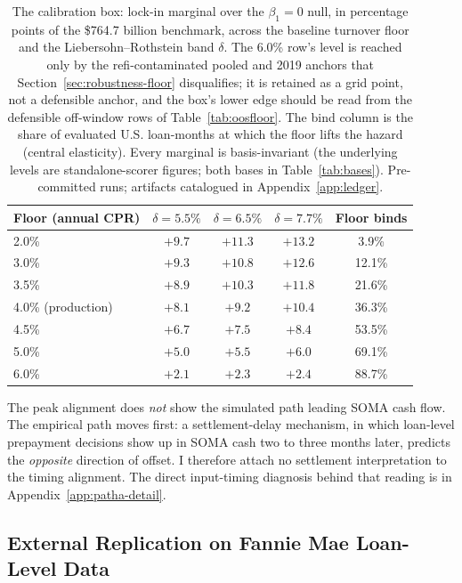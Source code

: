 \documentclass[12pt]{article}
\begin{document}
\begin{table}[!t]
\centering
\caption{The calibration box: lock-in marginal over the $\beta_1 = 0$ null, in percentage points of the \$764.7 billion benchmark, across the baseline turnover floor and the Liebersohn--Rothstein band $\delta$. The 6.0\% row's level is reached only by the refi-contaminated pooled and 2019 anchors that Section~\ref{sec:robustness-floor} disqualifies; it is retained as a grid point, not a defensible anchor, and the box's lower edge should be read from the defensible off-window rows of Table~\ref{tab:oosfloor}. The bind column is the share of evaluated U.S. loan-months at which the floor lifts the hazard (central elasticity). Every marginal is basis-invariant (the underlying levels are standalone-scorer figures; both bases in Table~\ref{tab:bases}). Pre-committed runs; artifacts catalogued in Appendix~\ref{app:ledger}.}
\label{tab:floorband}
\begin{tabular}{lcccc}
\toprule
Floor (annual CPR) & $\delta = 5.5\%$ & $\delta = 6.5\%$ & $\delta = 7.7\%$ & Floor binds \\
\midrule
2.0\% & $+9.7$ & $+11.3$ & $+13.2$ & 3.9\% \\
3.0\% & $+9.3$ & $+10.8$ & $+12.6$ & 12.1\% \\
3.5\% & $+8.9$ & $+10.3$ & $+11.8$ & 21.6\% \\
4.0\% (production) & $+8.1$ & $+9.2$ & $+10.4$ & 36.3\% \\
4.5\% & $+6.7$ & $+7.5$ & $+8.4$ & 53.5\% \\
5.0\% & $+5.0$ & $+5.5$ & $+6.0$ & 69.1\% \\
6.0\% & $+2.1$ & $+2.3$ & $+2.4$ & 88.7\% \\
\bottomrule
\end{tabular}
\end{table}

The peak alignment does \emph{not} show the simulated path leading SOMA cash flow. The empirical path moves first: a settlement-delay mechanism, in which loan-level prepayment decisions show up in SOMA cash two to three months later, predicts the \emph{opposite} direction of offset. I therefore attach no settlement interpretation to the timing alignment. The direct input-timing diagnosis behind that reading is in Appendix~\ref{app:patha-detail}.

\subsection{External Replication on Fannie Mae Loan-Level Data}\label{sec:pathb-fannie}
\end{document}
